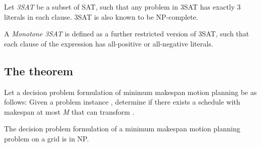 \begin{definition}
	Let \emph{3SAT} be a subset of SAT, such that any problem in 3SAT has exactly 3 literals in each clause. 3SAT is also known to be NP-complete.
\end{definition}

\begin{definition}
	A \emph{Monotone 3SAT} is defined as a further restricted version of 3SAT, such that each clause of the expression has all-positive or all-negative literals. 
\end{definition}










\subsection{The theorem}

Let a decision problem formulation of minimum makespan motion planning be as follows: Given a problem instance , determine if there exists a schedule with makespan at most \emph{M} that can transform .

\begin{lemma}\label{lemma:np}
	The decision problem formulation of a minimum makespan motion planning problem on a grid is in NP.
\end{lemma}

